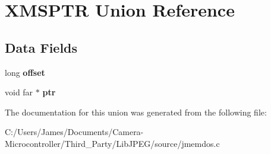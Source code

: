 \hypertarget{union_x_m_s_p_t_r}{}\section{X\+M\+S\+P\+TR Union Reference}
\label{union_x_m_s_p_t_r}
\subsection*{Data Fields}
\begin{DoxyCompactItemize}
\item 
\mbox{\label{union_x_m_s_p_t_r_adcce6ee751c1469525aec834a4d37ea8}} 
long {\bfseries offset}
\item 
\mbox{\label{union_x_m_s_p_t_r_a2692ff1078fd1d29b07a9e3d86255cf0}} 
void far $\ast$ {\bfseries ptr}
\end{DoxyCompactItemize}


The documentation for this union was generated from the following file\+:\begin{DoxyCompactItemize}
\item 
C\+:/\+Users/\+James/\+Documents/\+Camera-\/\+Microcontroller/\+Third\+\_\+\+Party/\+Lib\+J\+P\+E\+G/source/jmemdos.\+c\end{DoxyCompactItemize}
